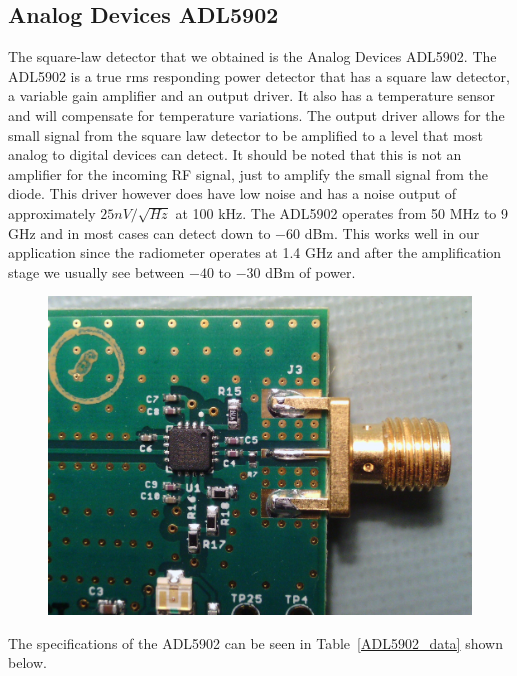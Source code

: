 \subsection{Analog Devices ADL5902}

The square-law detector that we obtained is the Analog Devices ADL5902.  The ADL5902 is a true rms responding power detector that has a square law detector, a variable gain amplifier and an output driver. It also has a temperature sensor and will compensate for temperature variations.  The output driver allows for the small signal from the square law detector to be amplified to a level that most analog to digital devices can detect.  It should be noted that this is not an amplifier for the incoming RF signal, just to amplify the small signal from the diode.  This driver however does have low noise and has a noise output of approximately $25nV/ \sqrt{Hz}$ at 100 kHz.  The ADL5902 operates from 50 MHz to 9 GHz and in most cases can detect down to $-60$ dBm.  This works well in our application since the radiometer operates at 1.4 GHz and after the amplification stage we usually see between $-40$ to $-30$ dBm of power.  

{\begin{figure}[h!tb] \centering
\includegraphics[width=\textwidth]{Images/adl5902.jpg}
\label{ADL5902}
\end{figure}
}

The specifications of the ADL5902 can be seen in Table~\ref{ADL5902_data} shown below.

